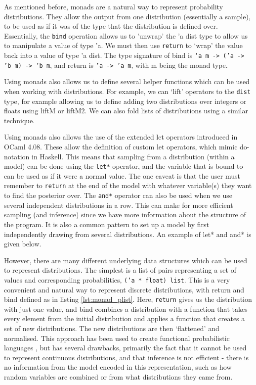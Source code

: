 As mentioned before, monads are a natural way to represent probability distributions. They allow the output from one distribution (essentially a sample), to be used as if it was of the type that the distribution is defined over. Essentially, the \texttt{bind} operation allows us to 'unwrap' the 'a dist type to allow us to manipulate a value of type 'a. We must then use \texttt{return} to `wrap' the value back into a value of type 'a dist. The type signature of bind is \texttt{'a m -> ('a -> 'b m) -> 'b m}, and return is \texttt{'a -> 'a m}, with m being the monad type.

Using monads also allows us to define several helper functions which can be used when working with distributions. For example, we can `lift' operators to the \texttt{dist} type, for example allowing us to define adding two distributions over integers or floats using liftM or liftM2. We can also fold lists of distributions using a similar technique.

Using monads also allows the use of the extended let operators introduced in OCaml 4.08. These allow the definition of custom let operators, which mimic do-notation in Haskell. This means that sampling from a distribution (within a model) can be done using the \texttt{let*} operator, and the variable that is bound to can be used as if it were a normal value. The one caveat is that the user must remember to \texttt{return} at the end of the model with whatever variable(s) they want to find the posterior over. The \texttt{and*} operator can also be used when we use several independent distributions in a row. This can make for more efficient sampling (and inference) since we have more information about the structure of the program. It is also a common pattern to set up a model by first independently drawing from several distributions. An example of let* and and* is given below.


However, there are many different underlying data structures which can be used to represent distributions. The simplest is a list of pairs representing a set of values and corresponding probabilities, \texttt{('a * float) list}. This is a very convenient and natural way to represent discrete distributions, with return and bind defined as in listing \ref{lst:monad_plist}. Here, \texttt{return} gives us the distribution with just one value, and bind combines a distribution with a function that takes every element from the initial distribution and applies a function that creates a set of new distributions. The new distributions are then `flattened' and normalised. This approach has been used to create functional probabilistic languages \cite{erwig}, but has several drawbacks, primarily the fact that it cannot be used to represent continuous distributions, and that inference is not efficient - there is no information from the model encoded in this representation, such as how random variables are combined or from what distributions they came from.

